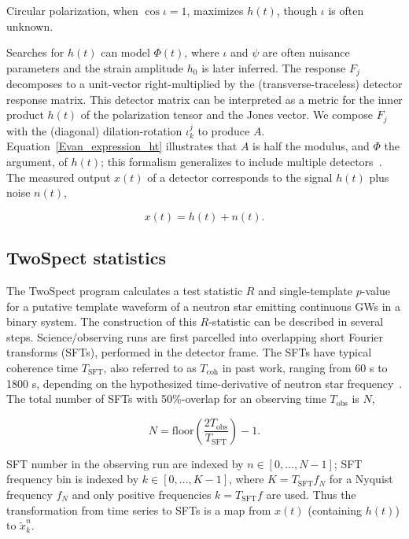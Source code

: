 \documentclass[12pt]{iopart}
\begin{document}
\noindent Circular polarization, when $\cos \iota =1$, maximizes $h(t)$, though $\iota$ is often unknown.

Searches for $h(t)$ can model $\Phi(t)$, where $\iota$ and $\psi$ are often nuisance parameters and the strain amplitude $h_0$ is later inferred.
The response $F_j$ decomposes to a unit-vector right-multiplied by the (transverse-traceless) detector response matrix. 
This detector matrix can be interpreted as a metric for the inner product $h(t)$ of the polarization tensor and the Jones vector.
We compose $F_j$ with the (diagonal) dilation-rotation $\iota^j_k$ to produce $A$.
Equation~\ref{Evan_expression_ht} illustrates that $A$ is half the modulus, and $\Phi$ the argument, of $h(t)$; this formalism generalizes to include multiple detectors~\cite{TwoSpectCoherentGoetz2015}. 
The measured output $x(t)$ of a detector corresponds to the signal $h(t)$ plus noise $n(t)$,

\begin{equation}
x(t) = h(t) + n(t).
\end{equation}

        \subsection{TwoSpect statistics}
        \label{all-sky}

The TwoSpect program calculates a test statistic $R$ and single-template $p$-value for a putative template waveform of a neutron star emitting continuous GWs in a binary system.
The construction of this $R$-statistic can be described in several steps.
Science/observing runs are first parcelled into overlapping short Fourier transforms (SFTs), performed in the detector frame.
The SFTs have typical coherence time $T_\mathrm{SFT}$, also referred to as $T_\mathrm{coh}$ in past work, ranging from 60 s to 1800 s, depending on the hypothesized time-derivative of neutron star frequency~\cite{GoetzTwoSpectMethods2011}.
The total number of SFTs with 50\%-overlap for an observing time $T_\mathrm{obs}$ is $N$,

\begin{equation}
N = \mathrm{floor}\left(\frac{2 T_\mathrm{obs}}{T_\mathrm{SFT}}\right) - 1.
\end{equation}

\noindent SFT number in the observing run are indexed by $n \in [0,\ldots,N-1]$; SFT frequency bin is indexed by $k \in [0,\ldots,K -1]$, where $K = T_\mathrm{SFT} f_N$ for a Nyquist frequency $f_N$ and only positive frequencies $k = T_\mathrm{SFT} f$ are used. 
Thus the transformation from time series to SFTs is a map from $x(t)$ (containing $h(t)$) to $\tilde{x}^n_k$.
\end{document}
